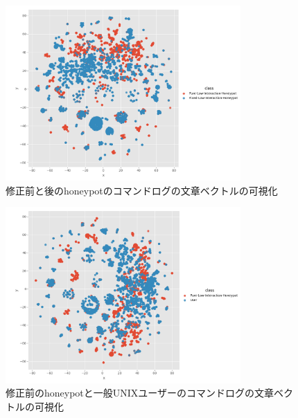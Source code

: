 \vspace{10mm}
\begin{figure}[htbp]
    \centering
    \includegraphics[width=0.8\textwidth]{figures/sufix.png}
    \caption{修正前と後のhoneypotのコマンドログの文章ベクトルの可視化}
    \label{fig:tsne1}
\end{figure}
\vspace{10mm}

\vspace{1mm}
\begin{figure}[htbp]
    \centering
    \includegraphics[width=0.8\textwidth]{figures/suuser.png}
    \caption{修正前のhoneypotと一般UNIXユーザーのコマンドログの文章ベクトルの可視化}
    \label{fig:tsne2}
\end{figure}
\vspace{3mm}

